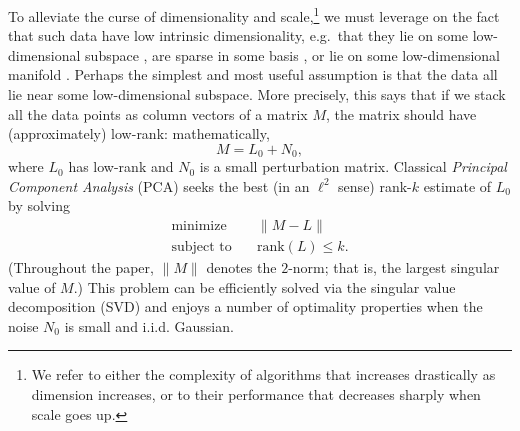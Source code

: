 To alleviate the curse of dimensionality and scale,\footnote{We refer to either the complexity of algorithms that increases drastically as dimension increases, or to their performance that decreases sharply when scale goes up.} we must leverage on the fact that such data have low intrinsic dimensionality, e.g.~that they lie on some low-dimensional subspace \cite{Eckart1936-Psychometrika}, are sparse in some basis \cite{ChenS2001-SIAM}, or lie on some low-dimensional manifold \cite{Tenenbaum2000-Science,Belkin2003-NC}. Perhaps the simplest and most useful assumption is that the data all lie near some low-dimensional subspace. More precisely, this says that if we stack all the data points as column vectors of a matrix $M$, the matrix should have (approximately) low-rank: mathematically,
\[
M = L_0 + N_0,
\]
where $L_0$ has low-rank and $N_0$ is a small perturbation matrix. Classical {\em Principal Component Analysis} (PCA) \cite{Hotelling,Eckart1936-Psychometrika,Jolliffe1986} seeks the best (in an $\ell^2$ sense) rank-$k$ estimate of $L_0$ by solving
\[

\begin{array}{ll}
    \text{minimize}   & \quad \|M - L\|\\
    \text{subject to} & \quad \text{rank}(L) \le k. 
  \end{array}

\] 
(Throughout the paper, $\|M\|$ denotes the $2$-norm; that is, the largest singular value of $M$.) This problem can be efficiently solved via the singular value decomposition (SVD) and enjoys a number of optimality properties when the noise $N_0$ is small and i.i.d. Gaussian.

